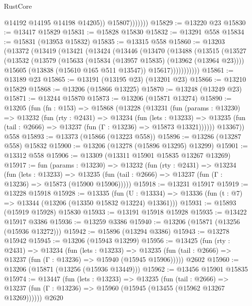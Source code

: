 \begin{lexlean}{RustCore}
\begin{coremodule}
                      @14192
                      @14195
                      @14198
                      @14205))
                  @15807)))))))
@15829 := @13220 @23
@15830 := @13417 @15829
@15831 := @15828 @15830
@15832 := @13291 @558
@15834 := @15831 (@13953 @15832)
@15835 := @13315 @558
@15860 := @13203
    (@13372
      (@13419
        (@13421
          (@13424
            (@13446
              (@13470
                (@13488
                  (@13515
                    (@13527
                      (@13532
                        (@13579
                          (@15633 (@15834 (@13957 @15835) (@13962 (@13964 @23))))
                          @15605
                          (@13838 (@15610 @165 @511 @13547))
                          @15617)))))))))))
@15861 := @13189 @23
@15865 := @13191 (@13195 @23) (@13201 @23)
@15866 := @13210 @15829
@15868 := @13206 (@15866 @13225)
@15870 := @13248 (@13249 @23)
@15871 := @13244 @15870
@15873 := @13206 (@15871 @13274)
@15890 := @13205
    (fun (fn : @153) =>
    @15868
      (@13228
        (@13231
          (fun (params : @13230) =>
          @13232
            (fun (rty : @2431) =>
            @13234
              (fun (lets : @13233) =>
              @13235 (fun (tail : @2666) => @13237 (fun (Γ : @13236) => @15873 @13321))))))
        @13367))
    @558
@15893 := @13373 (@15866 (@13223 @558))
@15896 := @13286 (@13287 @558) @15832
@15900 := @13206 (@13278 (@15896 @13295) @13299)
@15901 := @13312 @558
@15906 := @13309 (@13311 @15901 @15835 @13267 @13269)
@15917 := fun (params : @13230) =>
  @13232
    (fun (rty : @2431) =>
    @13234
      (fun (lets : @13233) =>
      @13235 (fun (tail : @2666) => @13237 (fun (Γ : @13236) => @15873 (@15900 @15906)))))
@15918 := @13231 @15917
@15919 := @13228 @15918
@15928 := @13335
    (fun (U : @13334) => @13336 (fun (t : @7) => @13344 (@13206 (@13350 @15832 @13224) @13361)))
@15931 := @15893 (@15919 @15928) @15830
@15933 := @13191 @15918 @15928
@15935 := @13422 @15917 @3386
@15936 := @13259 @3386
@15940 := @13206 (@15871 (@13256 (@15936 @13272)))
@15942 := @15896 (@13294 @3386)
@15943 := @13278 @15942
@15945 := @13206 (@15943 @13299)
@15956 := @13425
    (fun (rty : @2431) =>
    @13234
      (fun (lets : @13233) =>
      @13235 (fun (tail : @2666) => @13237 (fun (Γ : @13236) => @15940 (@15945 @15906)))))
    @2602
@15960 := @13206 (@15871 (@13256 (@15936 @13449)))
@15962 := @13456 @15901 @15835
@15974 := @13447
    (fun (lets : @13233) =>
    @13235
      (fun (tail : @2666) =>
      @13237 (fun (Γ : @13236) => @15960 (@15945 (@13455 (@15962 @13267 @13269))))))
    @2620

\end{coremodule}
\end{lexlean}
